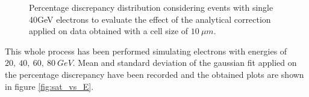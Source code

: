 \begin{figure}
	\centering
	 \quad
	\caption{Percentage discrepancy distribution considering events with single 40GeV electrons to evaluate the effect of the analytical correction applied on data obtained with a cell size of $10\ \mu m$.}
		\label{fig:sat_corr_perc}
\end{figure}

This whole process has been performed simulating electrons with energies of $20,\ 40,\ 60,\ 80\ GeV$. Mean and standard deviation of the gaussian fit applied on the percentage discrepancy have been recorded and the obtained plots are shown in figure \ref{fig:sat_vs_E}.\\

